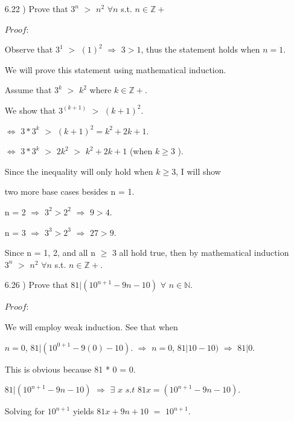 \documentclass[12pt]{article}
\newcommand{\N}{\mathbb N}
\newcommand{\Z}{\mathbb Z}
\newcommand{\ind}{\hspace{10mm}}
\begin{document}
\begin{enumerate}
			
		\item[6.22]) Prove that $3^n$ $>$ $n^2$ $\forall n $ s.t. $ n \in \Z +$
		
		$Proof : $
		
		\ind Observe that $3^1$ $>$ $(1)^2$ $\Rightarrow$ $3 > 1$, thus the statement holds when $n=1$.
		
		\ind We will prove this statement using mathematical induction. 
		 
		\ind \ind Assume that $3^k$ $>$ $k^2$ where $k \in \Z +$.
		
		\ind We show that $3^{(k+1)}$ $>$ $(k+1)^2$.
		
		\ind $\iff$ $ 3*3^k$ $>$ $(k+1)^2 = k^2 + 2k + 1 $.
		
		\ind $\iff$ $ 3*3^k$ $>$ $ 2k^2 $  $>$ $ k^2 + 2k + 1 $ (when $ k \geq 3$ ).

		\ind \ind Since the inequality will only hold when $ k \geq 3$, I will show
		
		\ind \ind two more base cases besides n = 1.

		\ind \ind n = 2 $\Rightarrow$ $3^2 > 2^2$ $\Rightarrow$ $ 9 > 4 $.		

		\ind \ind n = 3 $\Rightarrow$ $3^3 > 2^3$ $\Rightarrow$ $ 27 > 9 $.
		
		Since n = 1, 2, and all n $\geq$ 3 all hold true, then by mathematical induction $3^n$ $>$ $n^2$ 
		$\forall n $ s.t. $ n \in \Z +$. 

		\ind \ind \ind \ind \ind \ind 
		{%
			\setlength{\fboxsep}{1pt}%
			\setlength{\fboxrule}{2pt}%
		}%
		
		\item[6.26]) Prove that $ 81 | (10^{n+1} -9n -10)$ $\forall$ $n \in \N $.
		
		$Proof : $
		
		\ind We will employ weak induction. See that when
		
		\ind $n=0$, $ 81 | (10^{0+1} -9(0) -10)$. $\Rightarrow$ $n=0$, $ 81 | 10 - 10)$ $\Rightarrow$ $ 81 | 0$.
		
		\ind This is obvious because 81 * 0 = 0.
		
		\ind $ 81 | (10^{n+1} -9n -10)$ $\Rightarrow$ $\exists$ $x$ $s.t$ $81x = (10^{n+1} -9n -10)$.
		
		\ind Solving for $ 10^{n+1} $ yields $ 81x + 9n + 10$ $=$ $10^{n+1}$.
		

\end{enumerate}
\end{document}
